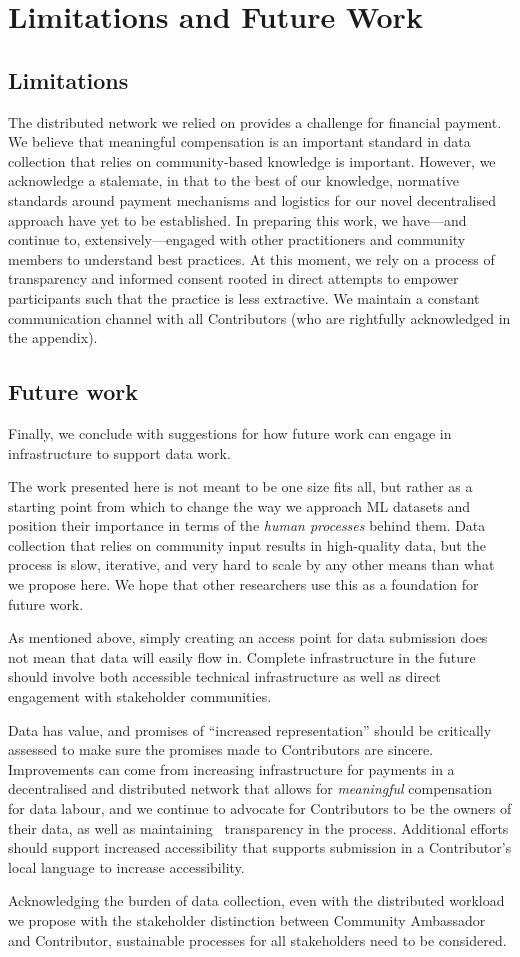 \section{Limitations and Future Work}\label{sec:limitations}

\subsection{Limitations}
The distributed network we relied on provides a challenge for financial payment. We believe that meaningful compensation is an important standard in data collection that relies on community-based knowledge is important. However, we acknowledge a stalemate, in that to the best of our knowledge, normative standards around payment mechanisms and logistics for our novel decentralised approach have yet to be established. In preparing this work, we have---and continue to, extensively---engaged with other practitioners and community members to understand best practices. At this moment, we rely on a process of transparency and informed consent rooted in direct attempts to empower participants such that the practice is less extractive. We maintain a constant communication channel with all Contributors (who are rightfully acknowledged in the appendix). 

\subsection{Future work}

Finally, we conclude with suggestions for how future work can engage in infrastructure to support data work. 

The work presented here is not meant to be one size fits all, but rather as a starting point from which to change the way we approach ML datasets and position their importance in terms of the \textit{human processes} behind them. Data collection that relies on community input results in high-quality data, but the process is slow, iterative, and very hard to scale by any other means than what we propose here. We hope that other researchers use this as a foundation for future work.

As mentioned above, simply creating an access point for data submission does not mean that data will easily flow in. Complete infrastructure in the future should involve both accessible technical infrastructure as well as direct engagement with stakeholder communities.

 Data has value, and promises of ``increased representation'' should be critically assessed to make sure the promises made to Contributors are sincere. Improvements can come from increasing infrastructure for payments in a decentralised and distributed network that allows for \textit{meaningful} compensation for data labour, and we continue to advocate for Contributors to be the owners of their data, as well as maintaining~\cite{tonja2024inkubalm} transparency in the process.  
Additional efforts should support increased accessibility that supports submission in a Contributor's local language to increase accessibility.

Acknowledging the burden of data collection, even with the distributed workload we propose with the stakeholder distinction between Community Ambassador and Contributor, sustainable processes for all stakeholders need to be considered. 
 